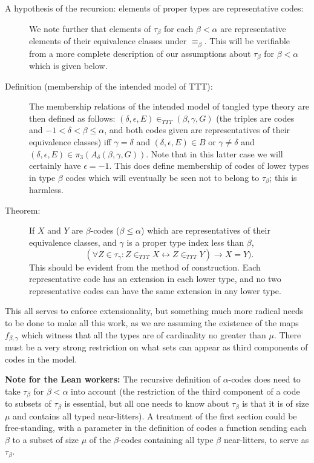 \documentclass[112pt]{article}
\begin{document}
\begin{description}
\item[A hypothesis of the recursion:  elements of proper types are representative codes:]

We note further that elements of $\tau_\beta$ for each $\beta<\alpha$ are representative elements of their equivalence classes under $\equiv_\beta$.  This will be verifiable from a more complete description of our assumptions about $\tau_\beta$ for $\beta<\alpha$ which is given below.

\item[Definition (membership of the intended model of TTT):]  The membership relations of the intended model of tangled type theory are then defined as follows: $(\delta,\epsilon,E) \in_{TTT} (\beta,\gamma,G)$ (the triples are codes and $-1<\delta<\beta \leq \alpha$, and both codes given are representatives of their equivalence classes) iff $\gamma=\delta$ and
$(\delta,\epsilon,E)  \in B$ or $\gamma\neq \delta$ and $(\delta,\epsilon,E) \in \pi_3(A_{\delta}(\beta,\gamma,G))$.  Note that in this latter case we will certainly have $\epsilon=-1$.  This does define membership of codes of lower types in
type $\beta$ codes which will eventually be seen not to belong to $\tau_\beta$;  this is harmless.

\item[Theorem:]  If $X$ and $Y$ are $\beta$-codes ($\beta \leq \alpha$) which are representatives of their equivalence classes, and $\gamma$ is a proper type index less than $\beta$,
$$(\forall Z \in \tau_\gamma: Z \in_{TTT} X \leftrightarrow Z \in_{TTT} Y) \rightarrow X = Y).$$  This should be evident from the method of construction.   Each representative code has an extension in each lower type, and no two representative codes can have the same extension in any lower type.

\end{description}

This all serves to enforce extensionality, but something much more radical needs to be done to make all this work, as we are assuming the existence of the maps $f_{\beta,\gamma}$ which witness that all the types are of cardinality no greater than $\mu$.  There must be a very strong restriction on what sets can appear as third components of codes in the model.


{\bf Note for the Lean workers:}  The recursive definition of $\alpha$-codes does need to take $\tau_\beta$ for $\beta<\alpha$ into account
(the restriction of the third component of a code to subsets of $\tau_\beta$ is essential, but all one needs to know about $\tau_\beta$ is that it is
of size $\mu$ and contains all typed near-litters).  A treatment of the first section could be free-standing, with a parameter in the definition of codes
a function sending each $\beta$ to a subset of size $\mu$ of the $\beta$-codes containing all type $\beta$ near-litters, to serve as $\tau_\beta$.
\end{document}
